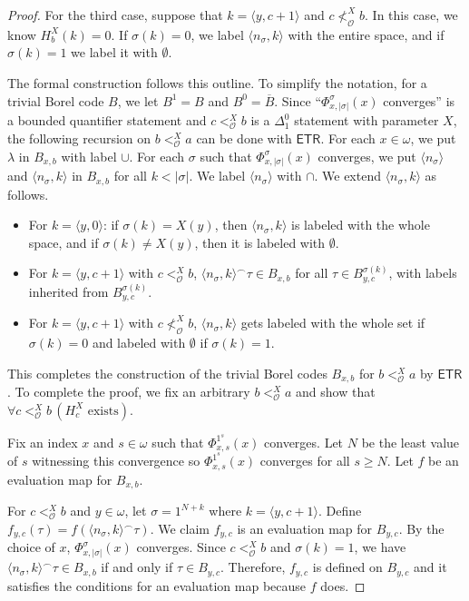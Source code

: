 \documentclass{amsart}
\theoremstyle{definition}
\theoremstyle{remark}
\begin{document}
\begin{proof}
For the third case, suppose that $k = \langle y,c+1 \rangle$ and $c \not <_{\mathcal{O}}^X b$. In this case, we know $H_b^X(k) = 0$. If $\sigma(k) = 0$,
we label $\langle n_\sigma, k\rangle$ with the entire space, and if $\sigma(k) =1$
we label it with $\emptyset$.  

The formal construction follows this outline. To simplify the notation, for a trivial Borel code $B$, we let $B^1 = B$ and $B^0 = \overline{B}$. 
Since ``$\Phi_{x,|\sigma|}^{\sigma}(x)$ converges'' is a bounded quantifier statement and 
$c <_{\mathcal{O}}^X b$ is a $\Delta^0_1$ statement with parameter $X$, the following recursion on $b <_{\mathcal{O}}^X a$ can be done with $\mathsf{ETR}$. 
For each $x \in \omega$, we put $\lambda$ in $B_{x,b}$ with label $\cup$.
For each $\sigma$ such that $\Phi_{x, |\sigma|}^{\sigma}(x)$ converges, we put $\langle n_\sigma \rangle$ and $\langle n_\sigma, k \rangle$ in $B_{x,b}$ for all $k < |\sigma|$. 
We label $\langle n_\sigma\rangle$ with $\cap$.
We extend $\langle n_\sigma, k \rangle$ as follows.
\begin{itemize}
\item For $k = \langle y,0 \rangle$: if $\sigma(k) = X(y)$, then $\langle n_\sigma, k \rangle$
is labeled with the whole space, and if $\sigma(k) \neq X(y)$, then it is labeled
with $\emptyset$.
\item For $k=\langle y,c+1 \rangle$ with $c <_{\mathcal{O}}^X b$, $\langle n_\sigma, k \rangle^{\smallfrown}\tau \in B_{x,b}$ for all $\tau \in B_{y,c}^{\sigma(k)}$, with 
labels inherited from $B_{y,c}^{\sigma(k)}$.
\item For $k=\langle y,c+1 \rangle$ with $c \not <_{\mathcal{O}}^X b$, $\langle n_\sigma, k\rangle$ gets labeled with the whole set if $\sigma(k)=0$ and labeled with
$\emptyset$ if $\sigma(k)=1$.
\end{itemize}

This completes the construction of the trivial Borel codes $B_{x,b}$ for $b <_{\mathcal{O}}^X a$ by $\mathsf{ETR}$. To complete the proof, we fix an arbitrary 
$b <_{\mathcal{O}}^X a$ and show that $\forall c <_{\mathcal{O}}^X b \, (H_c^X \text{ exists})$. 

Fix an index $x$ and $s \in \omega$ such that $\Phi_{x,s}^{1^s}(x)$ converges. Let $N$ be the least 
value of $s$ witnessing this convergence so $\Phi_{x,s}^{1^s}(x)$ converges for all $s \geq N$. Let $f$ be an evaluation map for $B_{x,b}$. 

For $c <_{\mathcal{O}}^X b$ and $y \in \omega$, let $\sigma = 1^{N+k}$ where $k = \langle y,c+1 \rangle$. Define 
$f_{y,c}(\tau) = f(\langle n_\sigma,k \rangle^{\smallfrown}\tau)$. We claim 
$f_{y,c}$ is an evaluation map for $B_{y,c}$. By the choice of $x$, $\Phi_{x,|\sigma|}^{\sigma}(x)$ converges.
Since $c <_{\mathcal{O}}^X b$ and $\sigma(k) = 1$, we have $\langle n_\sigma, k \rangle^{\smallfrown}\tau \in B_{x,b}$ if 
and only if $\tau \in B_{y,c}$. Therefore, $f_{y,c}$ is defined on $B_{y,c}$ and it satisfies the conditions for an evaluation map because $f$ does.


\end{proof}
\end{document}
